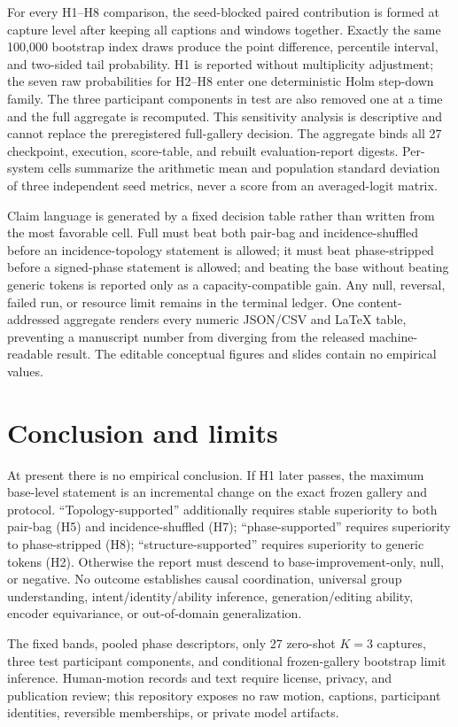 \documentclass{article}
\begin{document}
For every H1--H8 comparison, the seed-blocked paired contribution is formed at
capture level after keeping all captions and windows together. Exactly the same
100,000 bootstrap index draws produce the point difference, percentile
interval, and two-sided tail probability. H1 is reported without multiplicity
adjustment; the seven raw probabilities for H2--H8 enter one deterministic
Holm step-down family. The three participant components in test are also
removed one at a time and the full aggregate is recomputed. This sensitivity
analysis is descriptive and cannot replace the preregistered full-gallery
decision.
The aggregate binds all 27 checkpoint, execution, score-table, and rebuilt
evaluation-report digests. Per-system cells summarize the arithmetic mean and
population standard deviation of three independent seed metrics, never a score
from an averaged-logit matrix.

Claim language is generated by a fixed decision table rather than written from
the most favorable cell. Full must beat both pair-bag and incidence-shuffled
before an incidence-topology statement is allowed; it must beat phase-stripped
before a signed-phase statement is allowed; and beating the base without
beating generic tokens is reported only as a capacity-compatible gain. Any
null, reversal, failed run, or resource limit remains in the terminal ledger.
One content-addressed aggregate renders every numeric JSON/CSV and LaTeX table,
preventing a manuscript number from diverging from the released
machine-readable result. The editable conceptual figures and slides contain no
empirical values.

\section{Conclusion and limits}
At present there is no empirical conclusion. If H1 later passes, the maximum
base-level statement is an incremental change on the exact frozen gallery and
protocol. ``Topology-supported'' additionally requires stable superiority to
both pair-bag (H5) and incidence-shuffled (H7); ``phase-supported'' requires
superiority to phase-stripped (H8); ``structure-supported'' requires
superiority to generic tokens (H2). Otherwise the report must descend to
base-improvement-only, null, or negative. No outcome establishes causal
coordination, universal group understanding, intent/identity/ability inference,
generation/editing ability, encoder equivariance, or out-of-domain
generalization.

The fixed bands, pooled phase descriptors, only 27 zero-shot $K{=}3$ captures,
three test participant components, and conditional frozen-gallery bootstrap
limit inference. Human-motion records and text require license, privacy, and
publication review; this repository exposes no raw motion, captions,
participant identities, reversible memberships, or private model artifacts.



\end{document}
